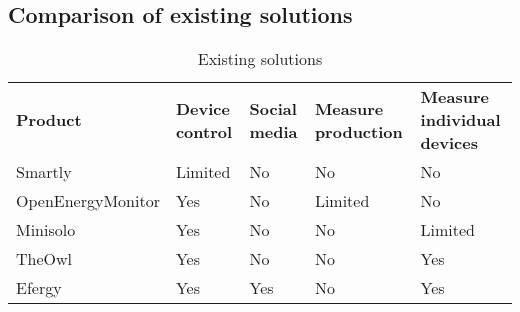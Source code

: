 \subsection{Comparison of existing solutions}
\begin{table}[H]
\centering
{}
\begin{tabular}{|l|l|p{2.6cm}|p{2.3cm}|p{2.2cm}|}
\hline
\textbf{Product} & \textbf{Device control} & \textbf{Social media} & \textbf{Measure production} & \textbf{Measure individual devices} \\
Smartly & Limited & No  & No & No\\
OpenEnergyMonitor & Yes & No  & Limited & No \\
Minisolo & Yes & No  & No & Limited\\
TheOwl & Yes & No & No & Yes\\
Efergy & Yes & Yes &  No & Yes\\\hline
\end{tabular}
\caption{Existing solutions}
\label{tab:existingSolutions}
\end{table}
